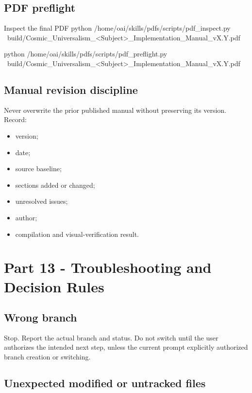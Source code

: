 \documentclass[11pt,letterpaper]{article}
\begin{document}
\subsection{PDF preflight}

\begin{commandbox}{Inspect the final PDF}
python /home/oai/skills/pdfs/scripts/pdf_inspect.py \
  build/Cosmic_Universalism_<Subject>_Implementation_Manual_vX.Y.pdf

python /home/oai/skills/pdfs/scripts/pdf_preflight.py \
  build/Cosmic_Universalism_<Subject>_Implementation_Manual_vX.Y.pdf
\end{commandbox}

\subsection{Manual revision discipline}

Never overwrite the prior published manual without preserving its version.
Record:

\begin{itemize}
    \item version;
    \item date;
    \item source baseline;
    \item sections added or changed;
    \item unresolved issues;
    \item author;
    \item compilation and visual-verification result.
\end{itemize}

\section{Part 13 - Troubleshooting and Decision Rules}

\subsection{Wrong branch}

Stop. Report the actual branch and status. Do not switch until the user
authorizes the intended next step, unless the current prompt explicitly
authorized branch creation or switching.

\subsection{Unexpected modified or untracked files}
\end{document}
